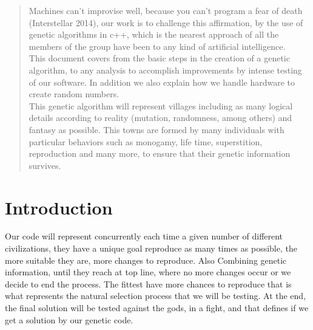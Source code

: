 \documentclass[twocolumn]{IEEEtran}
\begin{document}
\makeatletter
\def\markboth#1#2{\def\leftmark{\@IEEEcompsoconly{\sffamily}\MakeUppercase{\protect#1}}%
\def\rightmark{\@IEEEcompsoconly{\sffamily}\MakeUppercase{\protect#2}}}

\maketitle


\begin{abstract}

Machines can't improvise well, because you can't program a fear of death (Interstellar 2014), our work is to challenge this affirmation, by the use of genetic algorithms in c++, which is the nearest approach of all the members of the group have been to any kind of artificial intelligence.\\ 
This document covers from the basic steps in the creation of a genetic algorithm, to any analysis to accomplish improvements by intense testing of our software. In addition we also explain how we handle hardware to create random numbers\cite{21}.\\
This genetic algorithm will represent villages including as many logical details according to reality (mutation, randomness, among others) and fantasy as possible. This towns are formed by many individuals with particular behaviors such as monogamy, life time, superstition, reproduction and many more, to ensure that their genetic information survives.\cite{20} \cite{14} \cite{15}\\

\end{abstract}



\section{Introduction}
Our code will represent concurrently each time a given number of different civilizations, they have a unique goal reproduce as many times as possible, the more suitable they are, more changes to reproduce. Also Combining genetic information, until they reach at top line, where no more changes occur or we decide to end the process. The fittest have more chances to reproduce that is what represents the natural selection process that we will be testing. At the end, the final solution will be tested against the gods, in a fight, and that defines if we get a solution by our genetic code.
\end{document}

